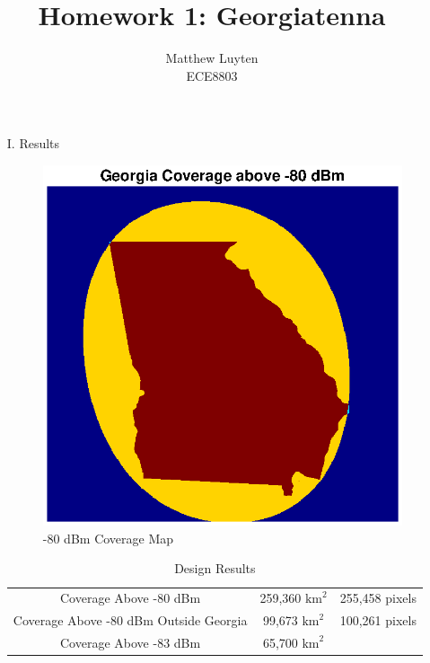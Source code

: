 \documentclass[12pt]{article}
\begin{document}
 
\title{Homework 1: Georgiatenna}
\author{Matthew Luyten\\ %
ECE8803}

\maketitle

\begin{enumerate} 
    \item[I.] Results
    
    \begin{figure}[!ht]
        \centering
        \includegraphics[width=5.5in]{ga_coverage.eps}
        \caption{-80 dBm Coverage Map}
    \end{figure}

    \begin{table}[h!]
        \centering
        \begin{tabular}{c c c} 
            \toprule
            Coverage Above -80 dBm & 259,360 $\text{km}^2$ & 255,458 pixels\\
            Coverage Above -80 dBm Outside Georgia & 99,673 $\text{km}^2$ & 100,261 pixels\\
            Coverage Above -83 dBm & 65,700 $\text{km}^2$ &\\
            \bottomrule
        \end{tabular}
        \caption{Design Results}
        \label{table:1}
    \end{table}
    

\end{enumerate}
\end{document}
